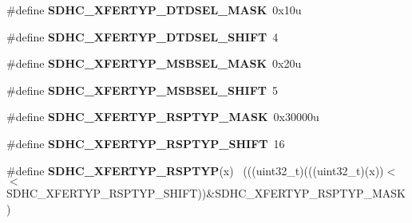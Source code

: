 \begin{DoxyCompactItemize}
\item 
\hypertarget{group___s_d_h_c___register___masks_ga608ac3efa7417c8763511d336a8cb6c7}{}\#define {\bfseries S\+D\+H\+C\+\_\+\+X\+F\+E\+R\+T\+Y\+P\+\_\+\+D\+T\+D\+S\+E\+L\+\_\+\+M\+A\+S\+K}~0x10u\label{group___s_d_h_c___register___masks_ga608ac3efa7417c8763511d336a8cb6c7}

\item 
\hypertarget{group___s_d_h_c___register___masks_ga669da614be8810a42499b583e2ce2617}{}\#define {\bfseries S\+D\+H\+C\+\_\+\+X\+F\+E\+R\+T\+Y\+P\+\_\+\+D\+T\+D\+S\+E\+L\+\_\+\+S\+H\+I\+F\+T}~4\label{group___s_d_h_c___register___masks_ga669da614be8810a42499b583e2ce2617}

\item 
\hypertarget{group___s_d_h_c___register___masks_gafb2312829ed2798040e4b2b0f17a0114}{}\#define {\bfseries S\+D\+H\+C\+\_\+\+X\+F\+E\+R\+T\+Y\+P\+\_\+\+M\+S\+B\+S\+E\+L\+\_\+\+M\+A\+S\+K}~0x20u\label{group___s_d_h_c___register___masks_gafb2312829ed2798040e4b2b0f17a0114}

\item 
\hypertarget{group___s_d_h_c___register___masks_ga9f13f1a35f73d15da1cb2e89a6919e30}{}\#define {\bfseries S\+D\+H\+C\+\_\+\+X\+F\+E\+R\+T\+Y\+P\+\_\+\+M\+S\+B\+S\+E\+L\+\_\+\+S\+H\+I\+F\+T}~5\label{group___s_d_h_c___register___masks_ga9f13f1a35f73d15da1cb2e89a6919e30}

\item 
\hypertarget{group___s_d_h_c___register___masks_ga0ed8f044a988ab8f1017f9f17c6087a5}{}\#define {\bfseries S\+D\+H\+C\+\_\+\+X\+F\+E\+R\+T\+Y\+P\+\_\+\+R\+S\+P\+T\+Y\+P\+\_\+\+M\+A\+S\+K}~0x30000u\label{group___s_d_h_c___register___masks_ga0ed8f044a988ab8f1017f9f17c6087a5}

\item 
\hypertarget{group___s_d_h_c___register___masks_gabcc1b92e4008ae1b4b0ad594d09906c1}{}\#define {\bfseries S\+D\+H\+C\+\_\+\+X\+F\+E\+R\+T\+Y\+P\+\_\+\+R\+S\+P\+T\+Y\+P\+\_\+\+S\+H\+I\+F\+T}~16\label{group___s_d_h_c___register___masks_gabcc1b92e4008ae1b4b0ad594d09906c1}

\item 
\hypertarget{group___s_d_h_c___register___masks_gaec81c7e2d355ea253d1e860076eecfb9}{}\#define {\bfseries S\+D\+H\+C\+\_\+\+X\+F\+E\+R\+T\+Y\+P\+\_\+\+R\+S\+P\+T\+Y\+P}(x)                                  ~(((uint32\+\_\+t)(((uint32\+\_\+t)(x))$<$$<$S\+D\+H\+C\+\_\+\+X\+F\+E\+R\+T\+Y\+P\+\_\+\+R\+S\+P\+T\+Y\+P\+\_\+\+S\+H\+I\+F\+T))\&S\+D\+H\+C\+\_\+\+X\+F\+E\+R\+T\+Y\+P\+\_\+\+R\+S\+P\+T\+Y\+P\+\_\+\+M\+A\+S\+K)\label{group___s_d_h_c___register___masks_gaec81c7e2d355ea253d1e860076eecfb9}


\end{DoxyCompactItemize}
